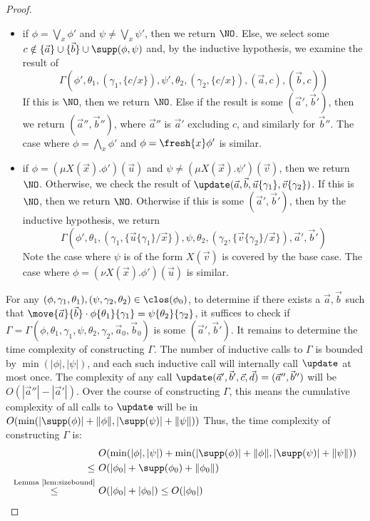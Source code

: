\begin{proof}
\begin{itemize}
		\item if $\phi = \bigvee_x \phi'$ and $\psi \neq \bigvee_x \psi'$, then we return $\NO$. 
		Else, we select some $c \notin \{\vec a\} \cup \{\vec b\} \cup \supp(\phi, \psi)$ and, by the inductive hypothesis,
		we examine the result of $$\Gamma(\phi', \theta_1, (\gamma_1, \{c/x\}), \psi', \theta_2, (\gamma_2, \{c/x\}), (\vec a, c), (\vec b, c))$$
		If this is $\NO$, then we return $\NO$. 
		Else if the result is some $(\vec a', \vec b')$, then we return $(\vec a'', \vec b'')$, where $\vec a''$ is $\vec a'$ excluding $c$, and similarly for $\vec b''$.
		The case where $\phi = \bigwedge_x \phi'$ and $\phi = \fresh{x}\phi'$ is similar.
		\item if $\phi = (\mu X(\vec x).\phi')(\vec u)$ and $\psi \neq (\mu X(\vec x).\psi')(\vec v)$, then we return $\NO$.
		Otherwise, we check the result of $\update(\vec a, \vec b, \vec u\{\gamma_1\}, \vec v\{\gamma_2\})$. If this is $\NO$, then we return $\NO$. 
		Otherwise if this is some $(\vec a', \vec b')$, then 
		by the inductive hypothesis, we return $$\Gamma(\phi', \theta_1, (\gamma_1, \{\vec u\{\gamma_1\} / \vec x\}), \psi, \theta_2, (\gamma_2, \{\vec v\{\gamma_2\} / \vec x\}), \vec a', \vec b')$$
		Note the case where $\psi$ is of the form $X(\vec v)$ is covered by the base case.
		The case where $\phi = (\nu X(\vec x).\phi')(\vec u)$ is similar.
	\end{itemize}
	For any $(\phi, \gamma_1, \theta_1), (\psi, \gamma_2, \theta_2) \in \clos(\phi_0)$, to determine if there exists a $\vec a, \vec b$ such that $\move{\vec a}{\vec b}\cdot \phi\{\theta_1\}\{\gamma_1\} = \psi\{\theta_2\}\{\gamma_2\}$, it suffices to check if $\Gamma = \Gamma(\phi, \theta_1, \gamma_1, \psi, \theta_2, \gamma_2, \vec a_0, \vec b_0)$ is some $(\vec a', \vec b')$.
	It remains to determine the time complexity of constructing $\Gamma$.  
	The number of inductive calls to $\Gamma$ is bounded by $\min(|\phi|, |\psi|)$, and each such inductive call will internally call $\update$ at most once.
	The complexity of any call $\update(\vec a', \vec b', \vec c, \vec d) = (\vec a'', \vec b'')$ will be $O(|\vec a''| - |\vec a'|)$.  
	Over the course of constructing $\Gamma$, this means the cumulative complexity of all calls to $\update$ will be in $O(\min(|\supp(\phi)| + \|\phi\|, |\supp(\psi)| + \|\psi\|))$
	Thus, the time complexity of constructing $\Gamma$ is:
	\begin{align*}
		&O(\min(|\phi|, |\psi|) + \min(|\supp(\phi)| + \|\phi\|, |\supp(\psi)| + \|\psi\|)) \\
		\le\ &O(|\phi_0| + \supp(\phi_0) + \|\phi_0\|) \\
		\overset{\text{Lemma~\ref{lem:sizebound}}}{\le}\ &O(|\phi_0| + |\phi_0|) \le O(|\phi_0|)
	\end{align*} 
\end{proof}

